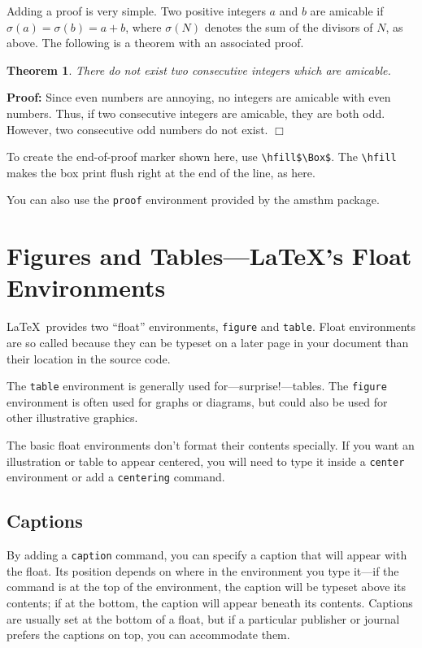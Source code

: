 \documentclass{icmmcm}
\newtheorem{Theo2}{Theorem}[section]
\newcommand{\bslash}{\symbol{'134}}%
\newcommand{\bsl}{{\texttt{\bslash}}}
\newcommand{\com}[1]{\bsl\texttt{#1}\xspace}
\newcommand{\package}[1]{\textsf{#1}\xspace}
\newcommand{\env}[1]{\texttt{#1}\xspace}
\begin{document}
{Adding a proof is very simple. Two positive integers $a$ and $b$ are
amicable if $\sigma(a) = \sigma(b) = a + b$, where $\sigma(N)$ denotes
the sum of the divisors of $N$, as above.  The following is a theorem
with an associated proof.

\begin{Theo2}
There do not exist two consecutive integers which are amicable.
\end{Theo2}
{\bf Proof:}
Since even numbers are annoying, no integers are amicable with even numbers.
Thus, if two consecutive integers are amicable, they are both odd. However,
two consecutive odd numbers do not exist. \hfill $\Box$

\medskip

To create the end-of-proof marker shown here, use 
\verb!\hfill$\Box$!. The \verb!\hfill! makes the box print flush right
at the end of the line, as here.

You can also use the \env{proof} environment provided by the
\package{amsthm} package.  


\section{Figures and Tables---\protect\LaTeX's Float Environments}%
\label{sec:figs-and-tabs}

\LaTeX\ provides two ``float'' environments, \env{figure} and
\env{table}.  Float environments are so called because they can be
typeset on a later page in your document than their location in the
source code.

The \env{table} environment is generally used
for---surprise!---tables.  The \env{figure} environment is often used
for graphs or diagrams, but could also be used for other illustrative
graphics.

The basic float environments don't format their contents specially.
If you want an illustration or table to appear centered, you will need
to type it inside a \env{center} environment or add a \com{centering}
command.

\subsection{Captions}%
\label{sec:captions}

By adding a \com{caption} command, you can specify a caption that will
appear with the float.  Its position depends on where in the
environment you type it---if the command is at the top of the
environment, the caption will be typeset above its contents; if at the
bottom, the caption will appear beneath its contents.  Captions are
usually set at the bottom of a float, but if a particular publisher or
journal prefers the captions on top, you can accommodate them.

}
\end{document}

